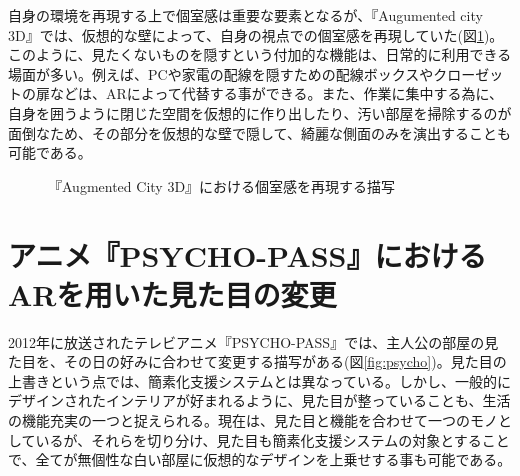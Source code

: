 自身の環境を再現する上で個室感は重要な要素となるが、『Augumented city 3D』では、仮想的な壁によって、自身の視点での個室感を再現していた(図\ref{fig:arcity03})。このように、見たくないものを隠すという付加的な機能は、日常的に利用できる場面が多い。例えば、PCや家電の配線を隠すための配線ボックスやクローゼットの扉などは、ARによって代替する事ができる。また、作業に集中する為に、自身を囲うように閉じた空間を仮想的に作り出したり、汚い部屋を掃除するのが面倒なため、その部分を仮想的な壁で隠して、綺麗な側面のみを演出することも可能である。

\begin{figure}[htbp]
  \begin{minipage}{0.5\hsize}
    \begin{center}
    \end{center}
  \end{minipage}
  \begin{minipage}{0.5\hsize}
    \begin{center}
    \end{center}
  \end{minipage}
  \caption{『Augmented City 3D』における個室感を再現する描写}
  \label{fig:arcity03}
\end{figure}


\section{アニメ『PSYCHO-PASS』におけるARを用いた見た目の変更}

2012年に放送されたテレビアニメ『PSYCHO-PASS』\cite{psycopass}では、主人公の部屋の見た目を、その日の好みに合わせて変更する描写がある(図\ref{fig:psycho})。見た目の上書きという点では、簡素化支援システムとは異なっている。しかし、一般的にデザインされたインテリアが好まれるように、見た目が整っていることも、生活の機能充実の一つと捉えられる。現在は、見た目と機能を合わせて一つのモノとしているが、それらを切り分け、見た目も簡素化支援システムの対象とすることで、全てが無個性な白い部屋に仮想的なデザインを上乗せする事も可能である。

